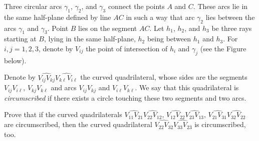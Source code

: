 Three circular arcs $\gamma_1$, $\gamma_2$, and $\gamma_3$ connect the points $A$ and $C$. These arcs lie in the same half-plane defined by line $AC$ in such a way that arc $\gamma_2$ lies between the arcs $\gamma_1$ and $\gamma_3$. Point $B$ lies on the segment $AC$. Let $h_1$, $h_2$, and $h_3$ be three rays starting at $B$, lying in the same half-plane, $h_2$ being between $h_1$ and $h_3$. For $i, j = 1, 2, 3$, denote by $V_{ij}$ the point of intersection of $h_i$ and $\gamma_j$ (see the Figure below).

Denote by $\widehat{V_{ij}V_{kj}}\widehat{V_{k\ell}V_{i\ell}}$ the curved quadrilateral, whose sides are the segments $V_{ij}V_{i\ell}$, $V_{kj}V_{k\ell}$ and arcs $V_{ij}V_{kj}$ and $V_{i\ell}V_{k\ell}$. We say that this quadrilateral is \emph{circumscribed} if there exists a circle touching these two segments and two arcs.

Prove that if the curved quadrilaterals $\widehat{V_{11}V_{21}}\widehat{V_{22}V_{12}}$, $\widehat{V_{12}V_{22}}\widehat{V_{23}V_{13}}$, $\widehat{V_{21}V_{31}}\widehat{V_{32}V_{22}}$ are circumscribed, then the curved quadrilateral $\widehat{V_{22}V_{32}}\widehat{V_{33}V_{23}}$ is circumscribed, too.
